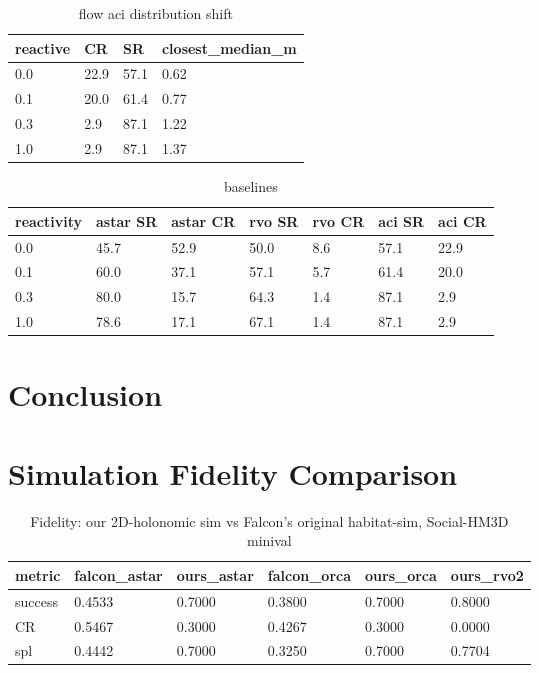 \documentclass[letterpaper]{article} %
\begin{document}
\begin{table}[!ht]
    \centering
    \begin{tabular}{|l|l|l|l|}
    \hline
        reactive & CR & SR & closest\_median\_m \\ \hline
        0.0 & 22.9 & 57.1 & 0.62 \\ \hline
        0.1 & 20.0 & 61.4 & 0.77 \\ \hline
        0.3 & 2.9 & 87.1 & 1.22 \\ \hline
        1.0 & 2.9 & 87.1 & 1.37 \\ \hline
    \end{tabular}
    \caption{flow aci distribution shift}
\end{table}

\begin{table}[!ht]
    \centering
    \begin{tabular}{|l|l|l|l|l|l|l|}
    \hline
        reactivity & astar SR & astar CR & rvo SR & rvo CR & aci SR & aci CR \\ \hline
        0.0 & 45.7 & 52.9 & 50.0 & 8.6 & 57.1 & 22.9 \\ \hline
        0.1 & 60.0 & 37.1 & 57.1 & 5.7 & 61.4 & 20.0 \\ \hline
        0.3 & 80.0 & 15.7 & 64.3 & 1.4 & 87.1 & 2.9 \\ \hline
        1.0 & 78.6 & 17.1 & 67.1 & 1.4 & 87.1 & 2.9 \\ \hline
    \end{tabular}
    \caption{baselines}
\end{table}


\section{Conclusion}


\appendix
\section{Simulation Fidelity Comparison}
\begin{table}[!ht]
    \centering
    \begin{tabular}{|l|l|l|l|l|l|}
    \hline
        metric & falcon\_astar & ours\_astar & falcon\_orca & ours\_orca & ours\_rvo2 \\ \hline
        success & 0.4533 & 0.7000 & 0.3800 & 0.7000 & 0.8000 \\ \hline
        CR & 0.5467 & 0.3000 & 0.4267 & 0.3000 & 0.0000 \\ \hline
        spl & 0.4442 & 0.7000 & 0.3250 & 0.7000 & 0.7704 \\ \hline
    \end{tabular}
    \caption{Fidelity: our 2D-holonomic sim vs Falcon's original habitat-sim, Social-HM3D minival}
\end{table}
\end{document}
